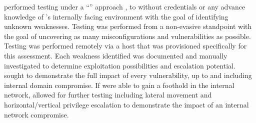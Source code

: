 \qquad\brandName performed testing under a “\typePentest” approach \initialDate , to \finalDate without
credentials or any advance knowledge of \enterpriseName’s internally facing environment with the goal of identifying
unknown weaknesses. Testing was performed from a non-evasive standpoint with the goal of uncovering as many
misconfigurations and vulnerabilities as possible. Testing was performed remotely via a host that was provisioned
specifically for this assessment. Each weakness identified was documented and manually investigated to determine
exploitation possibilities and escalation potential. \brandName sought to demonstrate the full impact of every
vulnerability, up to and including internal domain compromise. If \brandName were able to gain a foothold in
the internal network, \enterpriseName allowed for further testing including lateral movement and horizontal/vertical
privilege escalation to demonstrate the impact of an internal network compromise.